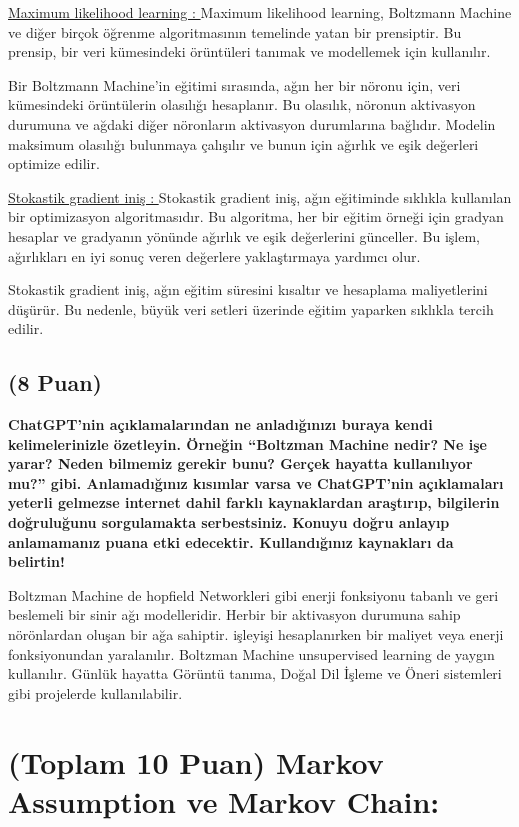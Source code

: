 \documentclass[11pt]{article}
\begin{document}
\underline{Maximum likelihood learning : } Maximum likelihood learning, Boltzmann Machine ve diğer birçok öğrenme algoritmasının temelinde yatan bir prensiptir. Bu prensip, bir veri kümesindeki örüntüleri tanımak ve modellemek için kullanılır.

Bir Boltzmann Machine'in eğitimi sırasında, ağın her bir nöronu için, veri kümesindeki örüntülerin olasılığı hesaplanır. Bu olasılık, nöronun aktivasyon durumuna ve ağdaki diğer nöronların aktivasyon durumlarına bağlıdır. Modelin maksimum olasılığı bulunmaya çalışılır ve bunun için ağırlık ve eşik değerleri optimize edilir.

\underline{Stokastik gradient iniş : } Stokastik gradient iniş, ağın eğitiminde sıklıkla kullanılan bir optimizasyon algoritmasıdır. Bu algoritma, her bir eğitim örneği için gradyan hesaplar ve gradyanın yönünde ağırlık ve eşik değerlerini günceller. Bu işlem, ağırlıkları en iyi sonuç veren değerlere yaklaştırmaya yardımcı olur.

Stokastik gradient iniş, ağın eğitim süresini kısaltır ve hesaplama maliyetlerini düşürür. Bu nedenle, büyük veri setleri üzerinde eğitim yaparken sıklıkla tercih edilir.


\subsection{(8 Puan)} \textbf{ChatGPT’nin açıklamalarından ne anladığınızı buraya kendi kelimelerinizle özetleyin. Örneğin ``Boltzman Machine nedir? Ne işe yarar? Neden bilmemiz gerekir bunu? Gerçek hayatta kullanılıyor mu?'' gibi. Anlamadığınız kısımlar varsa ve ChatGPT’nin açıklamaları yeterli gelmezse internet dahil farklı kaynaklardan araştırıp, bilgilerin doğruluğunu sorgulamakta serbestsiniz. Konuyu doğru anlayıp anlamamanız puana etki edecektir. Kullandığınız kaynakları da belirtin!}

Boltzman Machine de hopfield Networkleri gibi enerji fonksiyonu tabanlı ve geri beslemeli bir sinir ağı modelleridir. Herbir bir aktivasyon durumuna sahip nörönlardan oluşan bir ağa sahiptir. işleyişi hesaplanırken bir maliyet veya enerji fonksiyonundan yaralanılır. Boltzman Machine unsupervised learning de yaygın kullanılır. Günlük hayatta Görüntü tanıma, Doğal Dil İşleme ve Öneri sistemleri gibi projelerde kullanılabilir.


\section{(Toplam 10 Puan) Markov Assumption ve Markov Chain:}
\end{document}
